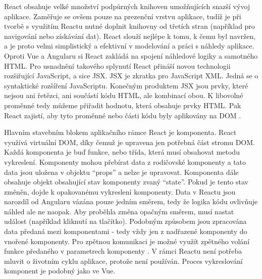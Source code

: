 React obsahuje velké množství podpůrných knihoven umožňujících snazší vývoj aplikace. Zaměřuje se ovšem pouze na prezenční vrstvu aplikace, tudíž je při tvorbě s využitím Reactu nutné doplnit knihovny od třetích stran (například pro navigování nebo získávání dat). React slouží nejlépe k tomu, k čemu byl navržen, a je proto velmi simplistický a efektivní v modelování a práci s náhledy aplikace. Oproti Vue a Angularu si React zakládá na spojení náhledové logiky a samotného HTML. Pro usnadnění takového splynutí React přináší novou technologii rozšiřující JavaScript, a sice JSX. JSX je zkratka pro JavaScript XML. Jedná se o syntaktické rozšíření JavaScriptu. Konečným produktem JSX jsou prvky, které nejsou ani řetězci, ani součástí kódu HTML, ale kombinací obou. K libovolné proměnné tedy můžeme přiřadit hodnotu, která obsahuje prvky HTML. Pak React zajistí, aby tyto proměnné nebo části kódu byly aplikovány na DOM \cite{reactintro}.

Hlavním stavebním blokem aplikačního rámce React je komponenta. React využívá virtuální DOM, díky čemuž je upravena jen potřebná část stromu DOM. Každá komponenta je buď funkce, nebo třída, která musí obsahovat metodu vykreslení. Komponenty mohou přebírat data z rodičovské komponenty a tato data jsou uložena v objektu “props” a nelze je upravovat. Komponenta dále obsahuje objekt obsahující stav komponenty zvaný “state”. Pokud je tento stav změněn, dojde k opakovanému vykreslení komponenty. Data v Reactu jsou narozdíl od Angularu vázána pouze jedním směrem, tedy že logika kódu ovlivňuje náhled ale ne naopak. Aby proběhla změna opačným směrem, musí nastat událost (například kliknutí na tlačítko). Podobným způsobem jsou zpracována data předaná mezi komponentami - tedy vždy jen z nadřazené komponenty do vnořené komponenty. Pro zpětnou komunikaci je možné využít zpětného volání funkce předaného v parametrech komponenty \cite{reacttutorial}. V rámci Reactu není potřeba mluvit o životním cyklu aplikace, protože není používán. Proces vykreslování komponent je podobný jako ve Vue.

